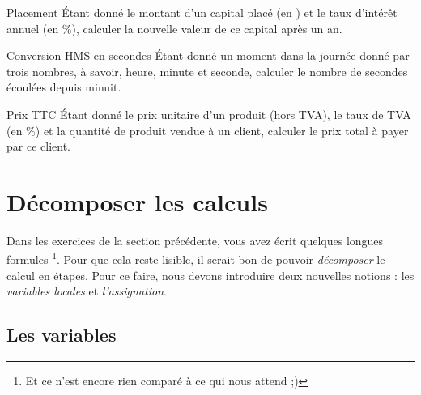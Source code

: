 			\begin{Exercice}{Placement}
				Étant donné le montant d’un capital placé (en \texteuro) 
				et le taux d’intérêt annuel (en \%), calculer la
				nouvelle valeur de ce capital après un an.
			\end{Exercice}
		
			\begin{Exercice}{Conversion HMS en secondes}
				Étant donné un moment dans la journée donné
				par trois nombres, à savoir, heure, minute et seconde, calculer le
				nombre de secondes écoulées depuis minuit.
			\end{Exercice}
	
			\begin{Exercice}{Prix TTC}
				Étant donné le prix unitaire d’un produit
				(hors TVA), le taux de TVA (en \%) 
				et la quantité de produit vendue à un client, 
				calculer le prix total à payer par ce client.
			\end{Exercice}
			
	\section{Décomposer les calculs}
	
		Dans les exercices de la section précédente,
		vous avez écrit quelques longues formules%
		\footnote{%
			Et ce n'est encore rien comparé à ce qui nous attend ;)%
		}.
		Pour que cela reste lisible,
		il serait bon de pouvoir \emph{décomposer}
		le calcul en étapes.
		Pour ce faire, nous devons introduire deux nouvelles notions :
		les \emph{variables locales} et \emph{l'assignation}.
		
		\subsection{Les variables}
		
